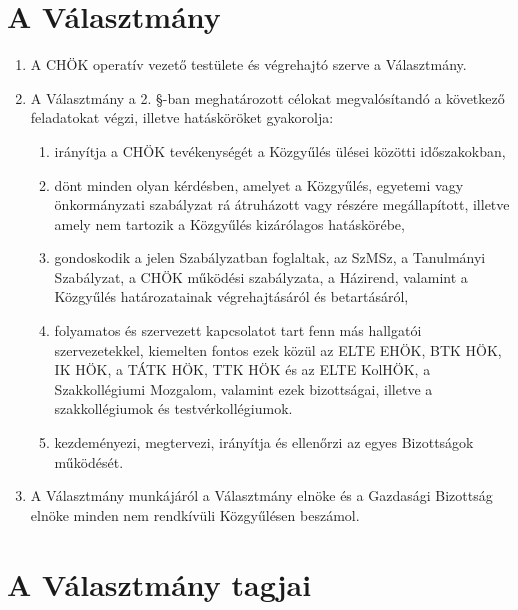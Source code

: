\documentclass{../styles/rulebook}
\begin{document}
\section{A Választmány}

\begin{enumerate}
	\item A CHÖK operatív vezető testülete és végrehajtó szerve a Választmány.
	\item A Választmány a 2. §-ban meghatározott célokat megvalósítandó a következő feladatokat végzi, illetve hatásköröket gyakorolja:
	\begin{enumerate}
		\item irányítja a CHÖK tevékenységét a Közgyűlés ülései közötti időszakokban,
		\item dönt minden olyan kérdésben, amelyet a Közgyűlés, egyetemi vagy önkormányzati szabályzat rá átruházott vagy részére megállapított, illetve amely nem tartozik a Közgyűlés kizárólagos hatáskörébe,
		\item gondoskodik a jelen Szabályzatban foglaltak, az SzMSz, a Tanulmányi Szabályzat, a CHÖK működési szabályzata, a Házirend, valamint a Közgyűlés határozatainak végrehajtásáról és betartásáról,
		\item folyamatos és szervezett kapcsolatot tart fenn más hallgatói szervezetekkel, kiemelten fontos ezek közül az ELTE EHÖK, BTK HÖK, IK HÖK, a TÁTK HÖK, TTK HÖK és az ELTE KolHÖK, a Szakkollégiumi Mozgalom, valamint ezek bizottságai, illetve a szakkollégiumok és testvérkollégiumok.
		\item kezdeményezi, megtervezi, irányítja és ellenőrzi az egyes Bizottságok működését.
	\end{enumerate}
	\item A Választmány munkájáról a Választmány elnöke és a Gazdasági Bizottság elnöke minden nem rendkívüli Közgyűlésen beszámol.
\end{enumerate}


\section{A Választmány tagjai}
\end{document}
